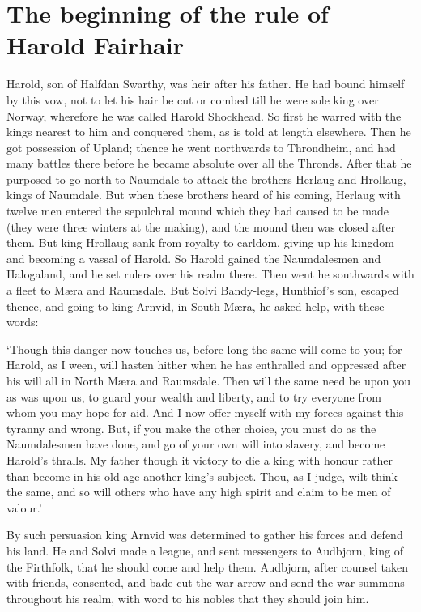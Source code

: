 \chapter{The beginning of the rule of Harold Fairhair}
Harold, son of Halfdan Swarthy, was heir after his father. He had bound himself by this vow, not to let his hair be cut or combed till he were sole king over Norway, wherefore he was called Harold Shockhead. So first he warred with the kings nearest to him and conquered them, as is told at length elsewhere. Then he got possession of Upland; thence he went northwards to Throndheim, and had many battles there before he became absolute over all the Thronds. After that he purposed to go north to Naumdale to attack the brothers Herlaug and Hrollaug, kings of Naumdale. But when these brothers heard of his coming, Herlaug with twelve men entered the sepulchral mound which they had caused to be made (they were three winters at the making), and the mound then was closed after them. But king Hrollaug sank from royalty to earldom, giving up his kingdom and becoming a vassal of Harold. So Harold gained the Naumdalesmen and Halogaland, and he set rulers over his realm there. Then went he southwards with a fleet to M\ae ra and Raumsdale. But Solvi Bandy-legs, Hunthiof's son, escaped thence, and going to king Arnvid, in South M\ae ra, he asked help, with these words:

`Though this danger now touches us, before long the same will come to you; for Harold, as I ween, will hasten hither when he has enthralled and oppressed after his will all in North M\ae ra and Raumsdale. Then will the same need be upon you as was upon us, to guard your wealth and liberty, and to try everyone from whom you may hope for aid. And I now offer myself with my forces against this tyranny and wrong. But, if you make the other choice, you must do as the Naumdalesmen have done, and go of your own will into slavery, and become Harold's thralls. My father though it victory to die a king with honour rather than become in his old age another king's subject. Thou, as I judge, wilt think the same, and so will others who have any high spirit and claim to be men of valour.'

By such persuasion king Arnvid was determined to gather his forces and defend his land. He and Solvi made a league, and sent messengers to Audbjorn, king of the Firthfolk, that he should come and help them. Audbjorn, after counsel taken with friends, consented, and bade cut the war-arrow and send the war-summons throughout his realm, with word to his nobles that they should join him.

